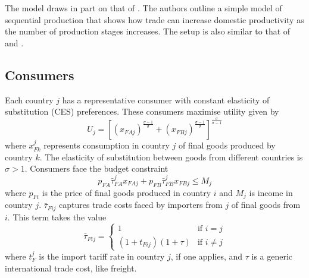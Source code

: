 \documentclass{article}
\begin{document}
The model draws in part on that of \textcite{melitz_missing_2014}. The authors outline a simple model of sequential production that shows how trade can increase domestic productivity as the number of production stages increases. The setup is also similar to that of \textcite{venables_trade_1987} and \textcite{bagwell_design_2016}.

\subsection{Consumers}
 
Each country $j$ has a representative consumer with constant elasticity of substitution (CES) preferences. These consumers maximise utility given by
\begin{equation}
    U_j = \left[ (x_{FAj})^{\frac{\sigma - 1}{\sigma}} + (x_{FBj})^{\frac{\sigma - 1}{\sigma}} \right]^{\frac{\sigma}{\sigma - 1}}
\end{equation}
where $x_{Fk}^j$ represents consumption in country $j$ of final goods produced by country $k$. The elasticity of substitution between goods from different countries is $\sigma > 1$. Consumers face the budget constraint 
\begin{equation}
    p_{FA} \bar{\tau}^{j}_{FA} x_{FAj} + p_{FB} \bar{\tau}^{j}_{FB} x_{FBj} \leq M_j
\end{equation}
where $p_{Fi}$ is the price of final goods produced in country $i$ and $M_j$ is income in country $j$. $\bar{\tau}_{Fij}$ captures trade costs faced by importers from $j$ of final goods from $i$. This term takes the value 
\begin{equation} \label{eq:tau}
    \bar{\tau}_{Fij} =
    \begin{cases}
        1 &\text{if } i = j \\
        (1 + t_{Fij})(1 + \tau) &\text{if } i \neq j
    \end{cases}
\end{equation}
where $t^j_{F}$ is the import tariff rate in country $j$, if one applies, and $\tau$ is a generic international trade cost, like freight. 
\end{document}
